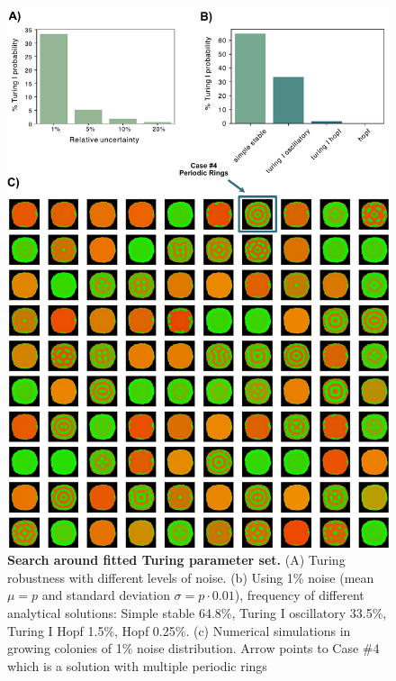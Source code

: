 \begin{figure}[H] %
    \centering
    \begin{adjustbox}{center}
        \includegraphics[width=1\textwidth]{chapters/Chapter 3/turing_fit_noise_robustness} %
    \end{adjustbox}
    \caption{\textbf{Search around fitted Turing parameter set.} (A) Turing robustness with different levels of noise. (b) Using 1\% noise (mean $\mu=p$ and standard deviation $\sigma=p\cdot 0.01$), frequency of different analytical solutions: Simple stable 64.8\%, Turing I oscillatory 33.5\%, Turing I Hopf 1.5\%, Hopf 0.25\%. (c) Numerical simulations in growing colonies of 1\% noise distribution. Arrow points to Case \#4 which is a solution with multiple periodic rings}
    \label{fig:turing_fit_noise_robustness}
\end{figure}

